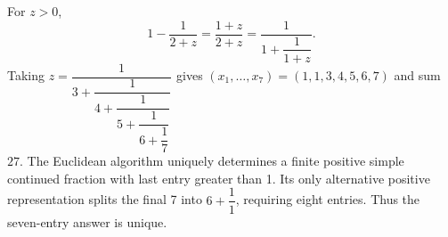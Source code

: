 For $z>0$,
\[1-\dfrac{1}{2+z}=\dfrac{1+z}{2+z}=\dfrac{1}{1+\dfrac{1}{1+z}}.\]
Taking $z=\dfrac{1}{3+\dfrac{1}{4+\dfrac{1}{5+\dfrac{1}{6+\dfrac{1}{7}}}}}$ gives $(x_1,\ldots,x_7)=(1,1,3,4,5,6,7)$ and sum $\boxed{27}$. The Euclidean algorithm uniquely determines a finite positive simple continued fraction with last entry greater than 1. Its only alternative positive representation splits the final 7 into $6+\dfrac{1}{1}$, requiring eight entries. Thus the seven-entry answer is unique.
